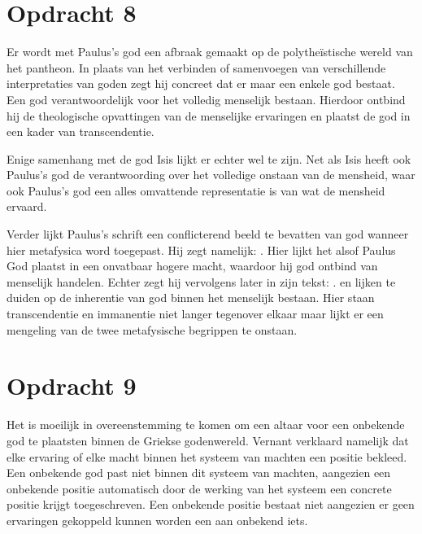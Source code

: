 \documentclass[10pt]{amsart}
\begin{document}
\section*{Opdracht 8}
Er wordt met Paulus's\autocite{paulusHandelingenApostelen1996} god een afbraak gemaakt op de polytheïstische wereld van het pantheon. In plaats van het verbinden of samenvoegen van verschillende interpretaties van goden zegt hij concreet dat er maar een enkele god bestaat. Een god verantwoordelijk voor het volledig menselijk bestaan. Hierdoor ontbind hij de theologische opvattingen van de menselijke ervaringen en plaatst de god in een kader van transcendentie.

Enige samenhang met de god Isis lijkt er echter wel te zijn. Net als Isis heeft ook Paulus's god de verantwoording over
het volledige onstaan van de mensheid, waar ook Paulus's god een alles omvattende representatie is van wat de mensheid
ervaard.

Verder lijkt Paulus's schrift een conflicterend beeld te bevatten van god wanneer hier metafysica word toegepast. Hij
zegt namelijk: \autocite{paulusHandelingenApostelen1996}. Hier lijkt het alsof Paulus God plaatst in
een onvatbaar hogere macht, waardoor hij god ontbind van menselijk handelen. Echter zegt hij vervolgens later in zijn
tekst: \autocite{paulusHandelingenApostelen1996}.  en  lijken te
duiden op de inherentie van god binnen het menselijk bestaan. Hier staan transcendentie en immanentie niet langer
tegenover elkaar maar lijkt er een mengeling van de twee metafysische begrippen te onstaan.

\section*{Opdracht 9}
Het is moeilijk in overeenstemming te komen om een altaar voor een onbekende god te plaatsten binnen de Griekse godenwereld. Vernant verklaard namelijk dat elke ervaring of elke macht binnen het systeem van machten een positie bekleed.\autocite{vernantGreceAncienneEtude1976} Een onbekende god past niet binnen dit systeem van machten, aangezien een onbekende positie automatisch door de werking van het systeem een concrete positie krijgt toegeschreven. Een onbekende positie bestaat niet aangezien er geen ervaringen gekoppeld kunnen worden een aan onbekend iets.
\end{document}
